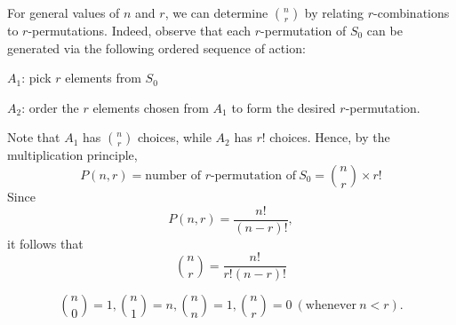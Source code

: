 For general values of \(n\) and \(r\), we can determine \(\binom{n}{r}\) by relating \(r\)-combinations to \(r\)-permutations. Indeed, observe that each \(r\)-permutation of \(S_0\) can be generated via the following ordered sequence of action:

\(A_1\): pick \(r\) elements from \(S_0\)

\(A_2\): order the \(r\) elements chosen from \(A_1\) to form the desired \(r\)-permutation.

Note that \(A_1\) has \(\binom{n}{r}\) choices, while \(A_2\) has \(r!\) choices. Hence, by the multiplication principle,
\[
    P(n, r) = \text{number of }r\text{-permutation of}\ S_0 = \binom{n}{r} \times r!
\]
Since
\[
    P(n, r) = \dfrac{n!}{(n - r)!},
\]
it follows that 
\[
    \binom{n}{r} = \dfrac{n!}{r!(n - r)!}
\]

\begin{corollary}
    \[
        \binom{n}{0} = 1, \binom{n}{1} = n, \binom{n}{n} = 1, \binom{n}{r} = 0\ (\text{whenever}\ n < r).
    \]
\end{corollary}